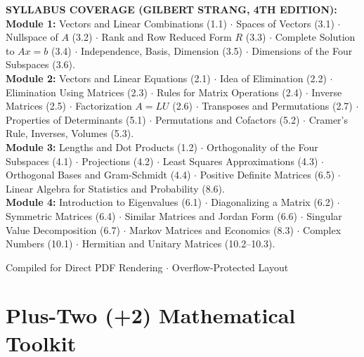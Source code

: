 \documentclass[11pt,a4paper,openany,oneside]{book}
\def\vect#1{#1}%
\def\mathbf#1{#1}%
\newcommand{\vect}[1]{\mathbf{#1}}
\numberwithin{equation}{chapter}
\begin{document}
\begin{titlepage}
\begin{tcolorbox}[enhanced,colback=slatesoft,colframe=teal,boxrule=1pt,arc=2mm,width=0.92\linewidth,left=5mm,right=5mm,top=4mm,bottom=4mm]
\selectfont\small
\textbf{\color{teal}SYLLABUS COVERAGE (GILBERT STRANG, 4TH EDITION):}\\[4pt]
\textbf{Module 1:} Vectors and Linear Combinations (1.1) $\cdot$ Spaces of Vectors (3.1) $\cdot$ Nullspace of $A$ (3.2) $\cdot$ Rank and Row Reduced Form $R$ (3.3) $\cdot$ Complete Solution to $A\vect{x}=\vect{b}$ (3.4) $\cdot$ Independence, Basis, Dimension (3.5) $\cdot$ Dimensions of the Four Subspaces (3.6).\\[4pt]
\textbf{Module 2:} Vectors and Linear Equations (2.1) $\cdot$ Idea of Elimination (2.2) $\cdot$ Elimination Using Matrices (2.3) $\cdot$ Rules for Matrix Operations (2.4) $\cdot$ Inverse Matrices (2.5) $\cdot$ Factorization $A=LU$ (2.6) $\cdot$ Transposes and Permutations (2.7) $\cdot$ Properties of Determinants (5.1) $\cdot$ Permutations and Cofactors (5.2) $\cdot$ Cramer's Rule, Inverses, Volumes (5.3).\\[4pt]
\textbf{Module 3:} Lengths and Dot Products (1.2) $\cdot$ Orthogonality of the Four Subspaces (4.1) $\cdot$ Projections (4.2) $\cdot$ Least Squares Approximations (4.3) $\cdot$ Orthogonal Bases and Gram-Schmidt (4.4) $\cdot$ Positive Definite Matrices (6.5) $\cdot$ Linear Algebra for Statistics and Probability (8.6).\\[4pt]
\textbf{Module 4:} Introduction to Eigenvalues (6.1) $\cdot$ Diagonalizing a Matrix (6.2) $\cdot$ Symmetric Matrices (6.4) $\cdot$ Similar Matrices and Jordan Form (6.6) $\cdot$ Singular Value Decomposition (6.7) $\cdot$ Markov Matrices and Economics (8.3) $\cdot$ Complex Numbers (10.1) $\cdot$ Hermitian and Unitary Matrices (10.2--10.3).
\end{tcolorbox}
\vfill
{\selectfont\small\color{slate} Compiled for Direct PDF Rendering $\cdot$ Overflow-Protected Layout\par}
\end{titlepage}

\tableofcontents
\cleardoublepage

\chapter[Plus-Two (+2) Mathematical Toolkit]{Plus-Two (+2) Mathematical Toolkit}
\end{document}
